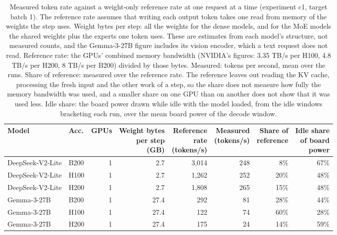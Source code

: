 \begin{table}[t]
\centering
\footnotesize
\setlength{\tabcolsep}{4pt}
\caption{Measured token rate against a weight-only reference rate at one request at a time (experiment c1, target batch 1). The reference rate assumes that writing each output token takes one read from memory of the weights the step uses. Weight bytes per step: all the weights for the dense models, and for the MoE models the shared weights plus the experts one token uses. These are estimates from each model's structure, not measured counts, and the Gemma-3-27B figure includes its vision encoder, which a text request does not read. Reference rate: the GPUs' combined memory bandwidth (NVIDIA's figures: 3.35 TB/s per H100, 4.8 TB/s per H200, 8 TB/s per B200) divided by those bytes. Measured: tokens per second, mean over the runs. Share of reference: measured over the reference rate. The reference leaves out reading the KV cache, processing the fresh input and the other work of a step, so the share does not measure how fully the memory bandwidth was used, and a smaller share on one GPU than on another does not show that it was used less. Idle share: the board power drawn while idle with the model loaded, from the idle windows bracketing each run, over the mean board power of the decode window.}\label{tab:roofline}
\begin{tabular}{llrrrrrr}
\toprule
Model & Acc. & GPUs & \makecell[r]{Weight bytes\\per step\\(GB)} & \makecell[r]{Reference\\rate\\(tokens/s)} & \makecell[r]{Measured\\(tokens/s)} & \makecell[r]{Share of\\reference} & \makecell[r]{Idle share\\of board\\power} \\
\midrule
DeepSeek-V2-Lite & B200 & 1 & 2.7 & 3,014 & 248 & 8\% & 67\% \\
DeepSeek-V2-Lite & H100 & 1 & 2.7 & 1,262 & 252 & 20\% & 48\% \\
DeepSeek-V2-Lite & H200 & 1 & 2.7 & 1,808 & 265 & 15\% & 48\% \\
Gemma-3-27B & B200 & 1 & 27.4 & 292 & 81 & 28\% & 44\% \\
Gemma-3-27B & H100 & 1 & 27.4 & 122 & 74 & 60\% & 28\% \\
Gemma-3-27B & H200 & 1 & 27.4 & 175 & 24 & 14\% & 59\% \\

\end{tabular}
\end{table}
